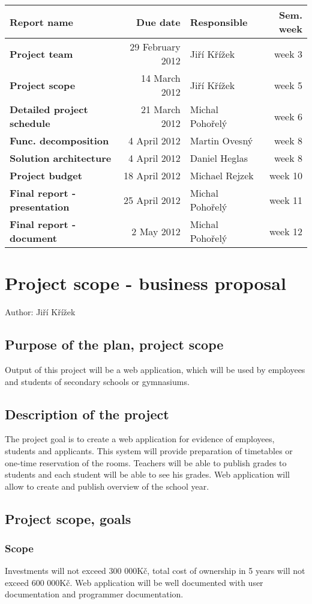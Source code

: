 \documentclass[12pt]{article}
\begin{document}
\begin{tabular}{|l|r|l|r|}
\hline
\bf{Report name} & \bf{Due date} & \bf{Responsible} & \bf{Sem. week} \\
\hline
\hline
{\bf Project team                } & 29 February 2012 & Jiří Křížek & week 3 \\
{\bf Project scope               } & 14 March 2012 & Jiří Křížek & week 5 \\
{\bf Detailed project schedule } & 21 March 2012 & Michal Pohořelý & week 6 \\
{\bf Func. decomposition } & 4 April 2012 & Martin Ovesný & week 8 \\
{\bf Solution architecture } & 4 April 2012 & Daniel Heglas & week 8 \\
{\bf Project budget } & 18 April 2012 & Michael Rejzek & week 10 \\
{\bf Final report - presentation } & 25 April 2012 & Michal Pohořelý & week 11 \\
{\bf Final report - document     } & 2 May 2012 & Michal Pohořelý & week 12 \\
\hline
\end{tabular}
\newpage
\section{Project scope - business proposal}
Author: Jiří Křížek
\subsection{Purpose of the plan, project scope}
Output of this project will be a web application, which will be used by employees and students of secondary schools or gymnasiums.
\subsection{Description of the project}
The project goal is to create a web application for evidence of employees, students and applicants. This system will provide preparation of timetables or one-time reservation of the rooms. Teachers will be able to publish grades to students and each student will be able to see his grades. Web application will allow to create and publish overview of the school year.
\subsection{Project scope, goals}

\subsubsection{Scope}
Investments will not exceed 300 000Kč, total cost of ownership in 5 years will not exceed 600 000Kč. Web application will be well documented with user documentation and programmer documentation.
\end{document}
